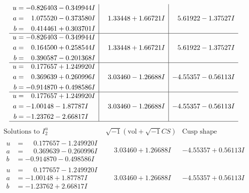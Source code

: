 \documentclass[1p]{elsarticle_modified}
\theoremstyle{definition}
\newcommand{\I}{\sqrt{-1}}
\begin{document}
$$\begin{array}{c|c|c}
\begin{aligned}
u &= -0.826403 - 0.349944 I \\
a &= \phantom{-}1.075520 - 0.373580 I \\
b &= \phantom{-}0.414461 + 0.303701 I\end{aligned}
 & \phantom{-}1.33448 + 1.66721 I & \phantom{-}5.61922 - 1.37527 I \\ \hline\begin{aligned}
u &= -0.826403 - 0.349944 I \\
a &= \phantom{-}0.164500 + 0.258544 I \\
b &= \phantom{-}0.390587 - 0.201368 I\end{aligned}
 & \phantom{-}1.33448 + 1.66721 I & \phantom{-}5.61922 - 1.37527 I \\ \hline\begin{aligned}
u &= \phantom{-}0.177657 + 1.249920 I \\
a &= \phantom{-}0.369639 + 0.260996 I \\
b &= -0.914870 + 0.498586 I\end{aligned}
 & \phantom{-}3.03460 - 1.26688 I & -4.55357 - 0.56113 I \\ \hline\begin{aligned}
u &= \phantom{-}0.177657 + 1.249920 I \\
a &= -1.00148 - 1.87787 I \\
b &= -1.23762 - 2.66817 I\end{aligned}
 & \phantom{-}3.03460 - 1.26688 I & -4.55357 - 0.56113 I\\
 \hline 
 \end{array}$$\newpage$$\begin{array}{c|c|c}  
\text{Solutions to }I^u_{2}& \I (\text{vol} + \sqrt{-1}CS) & \text{Cusp shape}\\
 \hline 
\begin{aligned}
u &= \phantom{-}0.177657 - 1.249920 I \\
a &= \phantom{-}0.369639 - 0.260996 I \\
b &= -0.914870 - 0.498586 I\end{aligned}
 & \phantom{-}3.03460 + 1.26688 I & -4.55357 + 0.56113 I \\ \hline\begin{aligned}
u &= \phantom{-}0.177657 - 1.249920 I \\
a &= -1.00148 + 1.87787 I \\
b &= -1.23762 + 2.66817 I\end{aligned}
 & \phantom{-}3.03460 + 1.26688 I & -4.55357 + 0.56113 I \\ \hline\begin{aligned}

\end{aligned}
\end{array}$$
\end{document}
